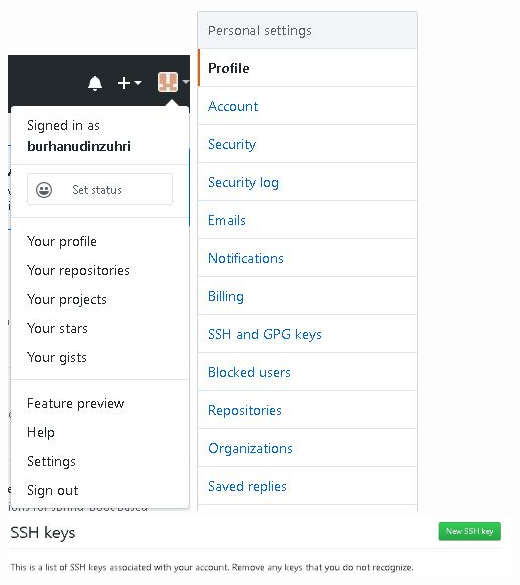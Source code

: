 \documentclass{article}
\begin{document}
                \includegraphics[scale=0.5]{32.3d.jpg}
                \includegraphics[scale=0.45]{32.3e.jpg}
                \newline
                \includegraphics[scale=0.5]{32.3f.jpg}
                \newline
    
\end{document}
